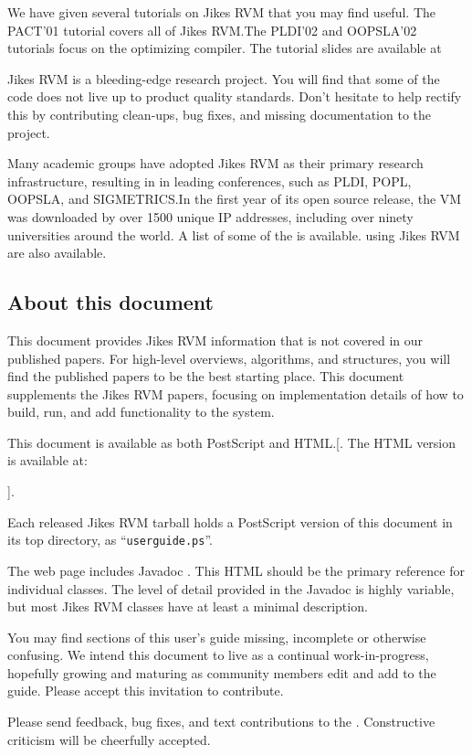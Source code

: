 We have given several tutorials on Jikes RVM that you may find
useful. The PACT'01 tutorial covers all of Jikes RVM.\@  The PLDI'02 and
OOPSLA'02 tutorials focus on the optimizing compiler.  The tutorial
slides are available at
\begin{quote}
\xlink{{\tt \RVMSlidesURL}}{\RVMSlidesURL}
\end{quote}

Jikes RVM is a bleeding-edge research project.  You will find that
some of the code does not live up to product quality standards.  Don't
hesitate to help rectify this by contributing clean-ups, bug fixes,
and missing documentation to the project.

Many academic groups have adopted Jikes RVM as their primary research
infrastructure, resulting in
in leading
conferences, such as PLDI, POPL, OOPSLA, and SIGMETRICS.\@  In the first year
of its open source release, the VM was downloaded by over
1500 unique IP addresses, including over ninety
universities around the world. A list
of some of the  is available.
 using
Jikes RVM are also available.

\subsection{About this document}

This document provides Jikes\TMweb{} RVM information that is not
covered in our published papers.  For high-level overviews,
algorithms, and structures, you will find the published papers to be
the best starting place. This document supplements the Jikes RVM
papers, focusing on implementation details of how to build, run,
and add functionality to the system.

This document is available as both PostScript\Rboth{} and HTML.\@  {}[.  The HTML version is
available at:
\begin{example}
\RVMUserGuideURL
\end{example}
].

Each released Jikes RVM tarball holds a PostScript version of this
document in its top directory, as ``{\tt userguide.ps}''.


The \jrvm{} web page includes Javadoc\TMboth{}
. 
This HTML should be the primary reference for individual classes. The
level of detail provided in the Javadoc is highly variable, but most
Jikes RVM classes have at least a minimal description.

You may find sections of this user's guide missing, incomplete or
otherwise confusing. We intend this document to live as a continual
work-in-progress, hopefully growing and maturing as community members
edit and add to the guide.  Please accept this invitation to
contribute.

Please send feedback, bug fixes, and text contributions to the 
.  
Constructive criticism will be cheerfully accepted. 


